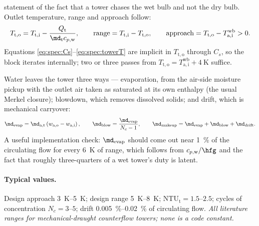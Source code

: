 statement of the fact that a tower chases the wet bulb and not the dry bulb. Outlet temperature,
range and approach follow:
\begin{equation}
T_{\mathrm{t,o}} = T_{\mathrm{t,i}} - \frac{Q_{\mathrm{t}}}{\md_{\mathrm{t}}c_{p,\mathrm{w}}} ,
\qquad
\mathrm{range} = T_{\mathrm{t,i}} - T_{\mathrm{t,o}} ,
\qquad
\mathrm{approach} = T_{\mathrm{t,o}} - T_{\mathrm{a,i}}^{\mathrm{wb}} > 0 .
\label{eq:spec:towerT}
\end{equation}
Equations \eqref{eq:spec:Cs}--\eqref{eq:spec:towerT} are implicit in $T_{\mathrm{t,o}}$ through
$C_{s}$, so the block iterates internally; two or three passes from
$T_{\mathrm{t,o}}=T_{\mathrm{a,i}}^{\mathrm{wb}}+\SI{4}{\kelvin}$ suffice.

Water leaves the tower three ways --- evaporation, from the air-side moisture pickup with the outlet
air taken as saturated at its own enthalpy (the usual Merkel closure); blowdown, which removes
dissolved solids; and drift, which is mechanical carryover:
\begin{equation}
\md_{\mathrm{evap}} = \md_{\mathrm{a,t}}\left(w_{\mathrm{a,o}}-w_{\mathrm{a,i}}\right) ,
\qquad
\md_{\mathrm{blow}} = \frac{\md_{\mathrm{evap}}}{N_{c}-1} ,
\qquad
\md_{\mathrm{makeup}} = \md_{\mathrm{evap}} + \md_{\mathrm{blow}} + \md_{\mathrm{drift}} .
\label{eq:spec:towerwater}
\end{equation}
A useful implementation check: $\md_{\mathrm{evap}}$ should come out near \SI{1}{\percent} of the
circulating flow for every \SI{6}{\kelvin} of range, which follows from $c_{p,\mathrm{w}}/\hfg$ and
the fact that roughly three-quarters of a wet tower's duty is latent.

\paragraph{Typical values.} Design approach \SIrange{3}{5}{\kelvin}; design range
\SIrange{5}{8}{\kelvin}; $\mathrm{NTU}_{\mathrm{t}}=\numrange{1.5}{2.5}$; cycles of concentration
$N_{c}=\numrange{3}{5}$; drift \SIrange{0.005}{0.02}{\percent} of circulating flow. \emph{All
literature ranges for mechanical-draught counterflow towers; none is a code constant.}

